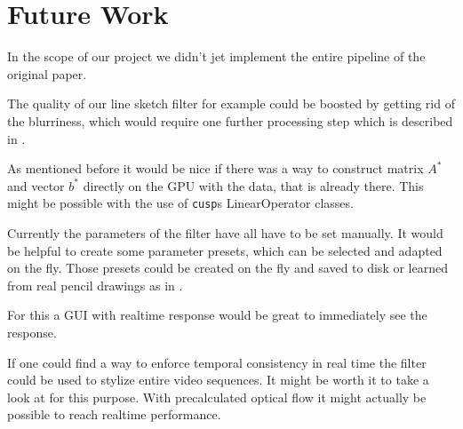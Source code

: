 \section{Future Work} \label{future-work}
In the scope of our project we didn't jet implement the entire pipeline of the
original paper. 

The quality of our line sketch filter for example could be boosted by getting
rid of the blurriness, which would require one further processing step which is
described in \cite{mainPaper}.

As mentioned before it would be nice if there was a way to construct matrix
$A^*$ and vector $b^*$ directly on the GPU with the data, that is already
there. This might be possible with the use of \texttt{cusp}s LinearOperator
classes.

Currently the parameters of the filter have all have to be set manually. It
would be helpful to create some parameter presets, which can be
selected and adapted on the fly. Those presets could be created on the fly
and saved to disk or learned from real pencil drawings as in \cite{mainPaper}.

For this a GUI with realtime response would be great to immediately see the
response. 

If one could find a way to enforce temporal consistency in real time the filter
could be used to stylize entire video sequences. It might be worth it to take a
look at \cite{temporal-consistency} for this purpose. With precalculated optical
flow it might actually be possible to reach realtime performance.
